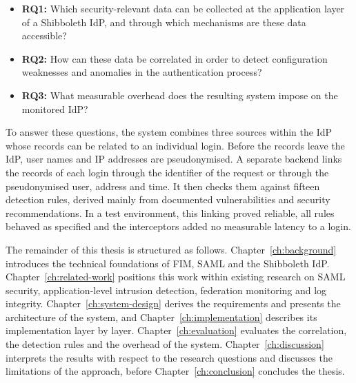 \documentclass[../main.tex]{subfiles}
\begin{document}
\begin{itemize}
    \item \textbf{RQ1:} Which security-relevant data can be collected at the application layer of a Shibboleth IdP, and through which mechanisms are these data accessible?
    \item \textbf{RQ2:} How can these data be correlated in order to detect configuration weaknesses and anomalies in the authentication process?
    \item \textbf{RQ3:} What measurable overhead does the resulting system impose on the monitored IdP?
\end{itemize}

To answer these questions, the system combines three sources within the IdP whose records can be 
related to an individual login. 
Before the records leave the IdP, user names and IP addresses are pseudonymised. 
A separate backend links the records of each login through the identifier of the request or through 
the pseudonymised user, address and time. 
It then checks them against fifteen detection rules, derived mainly from documented vulnerabilities 
and security recommendations. 
In a test environment, this linking proved reliable, all rules behaved as specified and the interceptors 
added no measurable latency to a login. 

The remainder of this thesis is structured as follows. 
Chapter~\ref{ch:background} introduces the technical foundations of FIM, SAML and the Shibboleth IdP. 
Chapter~\ref{ch:related-work} positions this work within existing research on SAML security, application-level 
intrusion detection, federation monitoring and log integrity. 
Chapter~\ref{ch:system-design} derives the requirements and presents the architecture of the 
system, and Chapter~\ref{ch:implementation} describes its implementation layer by layer. 
Chapter~\ref{ch:evaluation} evaluates the correlation, the detection rules and the overhead of the system. 
Chapter~\ref{ch:discussion} interprets the results with respect to the research questions and 
discusses the limitations of the approach, before Chapter~\ref{ch:conclusion} concludes the thesis. 
\end{document}
